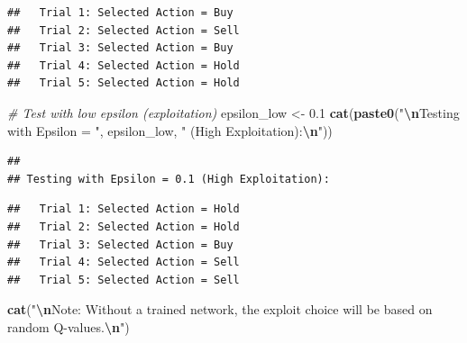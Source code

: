 \documentclass[
]{article}
\newenvironment{Shaded}{\begin{snugshade}}{\end{snugshade}}
\newcommand{\CommentTok}[1]{\textcolor[rgb]{0.56,0.35,0.01}{\textit{#1}}}
\newcommand{\ConstantTok}[1]{\textcolor[rgb]{0.56,0.35,0.01}{#1}}
\newcommand{\ControlFlowTok}[1]{\textcolor[rgb]{0.13,0.29,0.53}{\textbf{#1}}}
\newcommand{\DecValTok}[1]{\textcolor[rgb]{0.00,0.00,0.81}{#1}}
\newcommand{\FloatTok}[1]{\textcolor[rgb]{0.00,0.00,0.81}{#1}}
\newcommand{\FunctionTok}[1]{\textcolor[rgb]{0.13,0.29,0.53}{\textbf{#1}}}
\newcommand{\NormalTok}[1]{#1}
\newcommand{\OtherTok}[1]{\textcolor[rgb]{0.56,0.35,0.01}{#1}}
\newcommand{\SpecialCharTok}[1]{\textcolor[rgb]{0.81,0.36,0.00}{\textbf{#1}}}
\newcommand{\StringTok}[1]{\textcolor[rgb]{0.31,0.60,0.02}{#1}}
\begin{document}
\begin{verbatim}
##   Trial 1: Selected Action = Buy
##   Trial 2: Selected Action = Sell
##   Trial 3: Selected Action = Buy
##   Trial 4: Selected Action = Hold
##   Trial 5: Selected Action = Hold
\end{verbatim}

\begin{Shaded}
\begin{Highlighting}[]
\CommentTok{\# Test with low epsilon (exploitation)}
\NormalTok{epsilon\_low }\OtherTok{\textless{}{-}} \FloatTok{0.1}
\FunctionTok{cat}\NormalTok{(}\FunctionTok{paste0}\NormalTok{(}\StringTok{"}\SpecialCharTok{\textbackslash{}n}\StringTok{Testing with Epsilon = "}\NormalTok{, epsilon\_low, }\StringTok{" (High Exploitation):}\SpecialCharTok{\textbackslash{}n}\StringTok{"}\NormalTok{))}
\end{Highlighting}
\end{Shaded}

\begin{verbatim}
## 
## Testing with Epsilon = 0.1 (High Exploitation):
\end{verbatim}

\begin{Shaded}
\end{Shaded}

\begin{verbatim}
##   Trial 1: Selected Action = Hold
##   Trial 2: Selected Action = Hold
##   Trial 3: Selected Action = Buy
##   Trial 4: Selected Action = Sell
##   Trial 5: Selected Action = Sell
\end{verbatim}

\begin{Shaded}
\begin{Highlighting}[]
\FunctionTok{cat}\NormalTok{(}\StringTok{"}\SpecialCharTok{\textbackslash{}n}\StringTok{Note: Without a trained network, the \textquotesingle{}exploit\textquotesingle{} choice will be based on random Q{-}values.}\SpecialCharTok{\textbackslash{}n}\StringTok{"}\NormalTok{)}
\end{Highlighting}
\end{Shaded}
\end{document}
